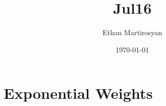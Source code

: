 \documentclass[12pt]{article}
\begin{document}
 
\title{Jul16}
\author{Ethan Martirosyan}
\date{\today}
\maketitle
{}
\hfuzz=50pt
\section*{Exponential Weights}
\end{document}
